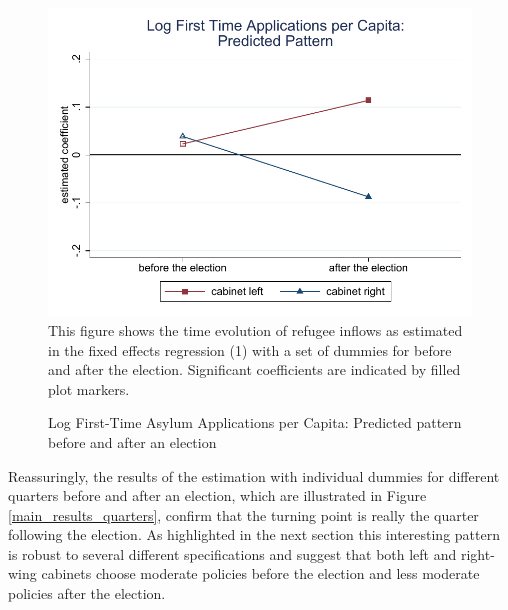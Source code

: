 \documentclass[a4paper,12pt]{article}
\begin{document}
 \begin{figure}
	\centering
    	\caption{Log First-Time Asylum Applications per Capita: Predicted pattern before and after an election}
	\includegraphics[width=1\textwidth]{app_Graph1.pdf}
    {\footnotesize This figure shows the time evolution of refugee inflows as estimated in the fixed effects regression (1) with a set of dummies for before and after the election. Significant coefficients are indicated by filled plot markers. }
	\label{main_results_bef-after}
\end{figure}

 Reassuringly, the results of the estimation with individual dummies for different quarters before and after an election, which are illustrated in Figure \ref{main_results_quarters}, confirm that the turning point is really the quarter following the election.  As highlighted in the next section this interesting pattern is robust to several different specifications and suggest that both left and right-wing cabinets choose moderate policies before the election and less moderate policies after the election.
\end{document}
